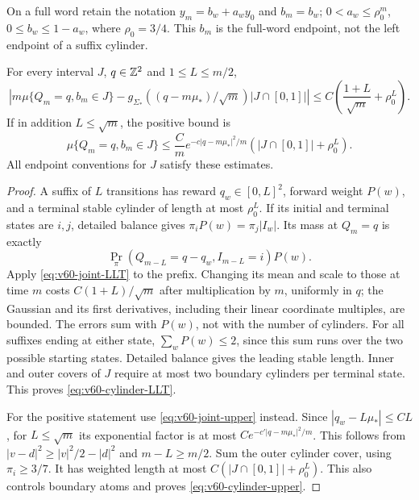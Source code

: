 On a full word retain the notation $y_m=b_w+a_wy_0$ and $b_m=b_w$;
$0<a_w\le\rho_0^m$, $0\le b_w\le1-a_w$, where $\rho_0=3/4$.
This $b_m$ is the full-word endpoint, not the left endpoint of a suffix
cylinder.

\begin{lemma}
\label{lem:v60-joint-cylinders}
For every interval $J$, $q\in\mathbb Z^2$ and $1\le L\le m/2$,
\begin{equation}\label{eq:v60-cylinder-LLT}
 \left|m\mu\{Q_m=q,b_m\in J\}
 -g_{\Sigma_*}((q-m\mu_*)/\sqrt m)|J\cap[0,1]|\right|
          \le C\left(\frac{1+L}{\sqrt m}+\rho_0^L\right).
\end{equation}
If in addition $L\le\sqrt m$, the positive bound is
\begin{equation}\label{eq:v60-cylinder-upper}
 \mu\{Q_m=q,b_m\in J\}
 \le \frac{C}{m}e^{-c|q-m\mu_*|^2/m}(|J\cap[0,1]|+\rho_0^L).
\end{equation}
All endpoint conventions for $J$ satisfy these estimates.
\end{lemma}
\begin{proof}
A suffix of $L$ transitions has reward $q_w\in[0,L]^2$, forward
weight $P(w)$, and a terminal stable cylinder of length at most
$\rho_0^L$. If its initial and terminal states are $i,j$, detailed
balance gives $\pi_iP(w)=\pi_j|I_w|$. Its mass at $Q_m=q$ is exactly
\[
 \Pr_\pi(Q_{m-L}=q-q_w,I_{m-L}=i)P(w).
\]
Apply \eqref{eq:v60-joint-LLT} to the prefix. Changing its mean and
scale to those at time $m$ costs $C(1+L)/\sqrt m$ after multiplication
by $m$, uniformly in $q$; the Gaussian and its first derivatives,
including their linear coordinate multiples, are bounded. The errors
sum with $P(w)$, not with the number of cylinders. For all suffixes
ending at either state, $\sum_wP(w)\le2$, since this sum runs over the
two possible starting states. Detailed balance gives the leading
stable length. Inner and outer covers of $J$ require at most two
boundary cylinders per terminal state. This proves
\eqref{eq:v60-cylinder-LLT}.

For the positive statement use \eqref{eq:v60-joint-upper} instead.
Since $|q_w-L\mu_*|\le CL$, for $L\le\sqrt m$ its exponential
factor is at most $C e^{-c'|q-m\mu_*|^2/m}$. This follows from
$|v-d|^2\ge |v|^2/2-|d|^2$ and $m-L\ge m/2$.
Sum the outer cylinder cover, using $\pi_i\ge3/7$. It has weighted
length at most $C(|J\cap[0,1]|+\rho_0^L)$. This also controls
boundary atoms and proves \eqref{eq:v60-cylinder-upper}.
\end{proof}

